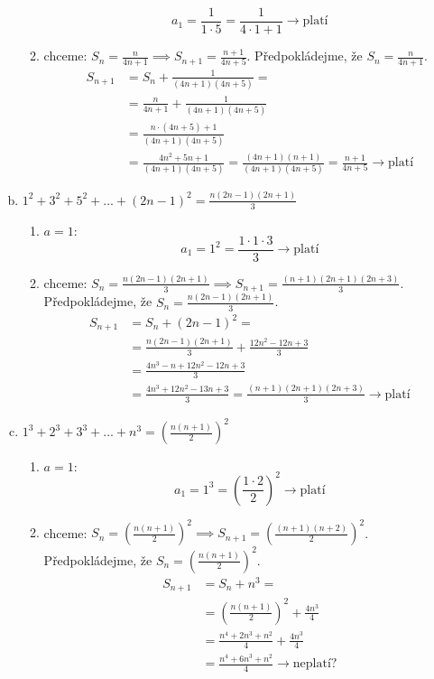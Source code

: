 \begin{example}[SÚM 242/18]
\begin{enumerate}[a.]
\begin{enumerate}[$i.$]
      $$a_1 = \frac{1}{1\cdot5} = \frac{1}{4\cdot1 + 1}\rightarrow  \textrm{platí}$$
      \item chceme: $S_n = \frac{n}{4n+1} \implies S_{n+1} = \frac{n+1}{4n+5}$. Předpokládejme, že $S_n = \frac{n}{4n+1}$.
      \begin{align*}
        S_{n+1} & = S_n + \frac{1}{(4n+1)(4n+5)} = \\
        & = \frac{n}{4n+1} + \frac{1}{(4n+1)(4n+5)}\\
        &= \frac{n\cdot(4n+5)+1}{(4n+1)(4n+5)}\\
        &= \frac{4n^2+5n+1}{(4n+1)(4n+5)} = \frac{(4n+1)(n+1)}{(4n+1)(4n+5)} = \frac{n+1}{4n+5} \rightarrow \textrm{platí}
      \end{align*}
    \end{enumerate}
  \item $1^2 + 3^2 + 5^2 + ... + (2n-1)^2 = \frac{n(2n-1)(2n+1)}{3}$
    \begin{enumerate}[$i.$]
      \item $a = 1:$
      $$a_1 = 1^2 = \frac{1\cdot1\cdot3}{3}\rightarrow  \textrm{platí}$$
      \item chceme: $S_n = \frac{n(2n-1)(2n+1)}{3} \implies S_{n+1} = \frac{(n+1)(2n+1)(2n+3)}{3}$. Předpokládejme, že $S_n = \frac{n(2n-1)(2n+1)}{3}$.
      \begin{align*}
        S_{n+1} & = S_n + (2n-1)^2 = \\
        & = \frac{n(2n-1)(2n+1)}{3} + \frac{12n^2-12n+3}{3}\\
        &= \frac{4n^3-n+12n^2-12n+3}{3}\\
        &= \frac{4n^3+12n^2-13n+3}{3} = \frac{(n+1)(2n+1)(2n+3)}{3} \rightarrow \textrm{platí}
      \end{align*}
    \end{enumerate}
    \item $1^3 + 2^3 + 3^3 + ... + n^3 = (\frac{n(n+1)}{2})^2$
      \begin{enumerate}[$i.$]
        \item $a = 1:$
        $$a_1 = 1^3 = (\frac{1\cdot2}{2})^2 \rightarrow  \textrm{platí}$$
        \item chceme: $S_n = (\frac{n(n+1)}{2})^2 \implies S_{n+1} =   (\frac{(n+1)(n+2)}{2})^2$. Předpokládejme, že $S_n = (\frac{n(n+1)}{2})^2$.
        \begin{align*}
          S_{n+1} & = S_n + n^3 = \\
          & = (\frac{n(n+1)}{2})^2 + \frac{4n^3}{4}\\
          &= \frac{n^4 + 2n^3 + n^2}{4} + \frac{4n^3}{4}\\
          &= \frac{n^4 + 6n^3 + n^2}{4} \rightarrow \textrm{neplatí?}
        \end{align*}
      \end{enumerate}
\end{enumerate}
\end{example}

